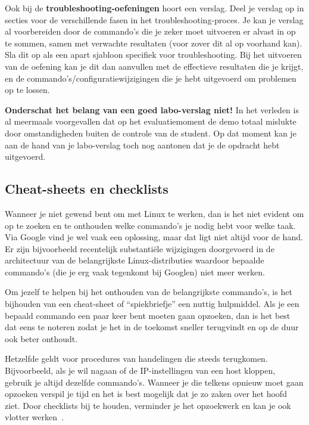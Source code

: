 Ook bij de \textbf{troubleshooting-oefeningen} hoort een verslag. Deel je verslag op in secties voor de verschillende fasen in het troubleshooting-proces. Je kan je verslag al voorbereiden door de commando's die je zeker moet uitvoeren er alvast in op te sommen, samen met verwachte resultaten (voor zover dit al op voorhand kan). Sla dit op als een apart sjabloon specifiek voor troubleshooting. Bij het uitvoeren van de oefening kan je dit dan aanvullen met de effectieve resultaten die je krijgt, en de commando's/configuratiewijzigingen die je hebt uitgevoerd om problemen op te lossen.

\textbf{Onderschat het belang van een goed labo-verslag niet!} In het verleden is al meermaals voorgevallen dat op het evaluatiemoment de demo totaal mislukte door omstandigheden buiten de controle van de student. Op dat moment kan je aan de hand van je labo-verslag toch nog aantonen dat je de opdracht hebt uitgevoerd.

\subsection{Cheat-sheets en checklists}%
\label{subs:cheat-sheets-en-checklists}

Wanneer je niet gewend bent om met Linux te werken, dan is het niet evident om op te zoeken en te onthouden welke commando's je nodig hebt voor welke taak. Via Google vind je wel vaak een oplossing, maar dat ligt niet altijd voor de hand. Er zijn bijvoorbeeld recentelijk substantiële wijzigingen doorgevoerd in de architectuur van de belangrijkste Linux-distributies waardoor bepaalde commando's (die je erg vaak tegenkomt bij Googlen) niet meer werken.

Om jezelf te helpen bij het onthouden van de belangrijkste commando's, is het bijhouden van een cheat-sheet of ``spiekbriefje'' een nuttig hulpmiddel. Als je een bepaald commando een paar keer bent moeten gaan opzoeken, dan is het best dat eens te noteren zodat je het in de toekomst sneller terugvindt en op de duur ook beter onthoudt.

Hetzelfde geldt voor procedures van handelingen die steeds terugkomen.  Bijvoorbeeld, als je wil nagaan of de IP-instellingen van een host kloppen, gebruik je altijd dezelfde commando's. Wanneer je die telkens opnieuw moet gaan opzoeken verspil je tijd en het is best mogelijk dat je zo zaken over het hoofd ziet. Door checklists bij te houden, verminder je het opzoekwerk en kan je ook vlotter werken~\autocite{Simmons2009}.

